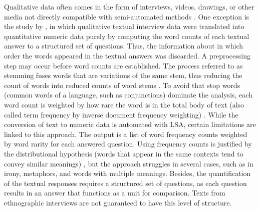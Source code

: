 Qualitative data often comes in the form of interviews, videos, drawings, or other media not directly compatible with semi-automated methods \citep{Bjrner2015}. One exception is the study by \cite{Miaskiewicz2008}, in which qualitative textual interview data were translated into quantitative numeric data purely by computing the word counts of each textual answer to a structured set of questions. Thus, the information about in which order the words appeared in the textual answers was discarded. A preprocessing step may occur before word counts are established. The process referred to as stemming fuses words that are variations of the same stem, thus reducing the count of words into reduced counts of word stems \citep{Grimmer2013}. To avoid that stop words (common words of a language, such as conjunctions) dominate the analysis, each word count is weighted by how rare the word is in the total body of text (also called term frequency by inverse document frequency weighting) \citep{Grimmer2013}. While the conversion of text to numeric data is automated with LSA, certain limitations are linked to this approach. The output is a list of word frequency counts weighted by word rarity for each answered question. Using frequency counts is justified by the distributional hypothesis (words that appear in the same contexts tend to convey similar meanings) \citep{Sahlgren2008}, but the approach struggles in several cases, such as in irony, metaphors, and words with multiple meanings. Besides, the quantification of the textual responses requires a structured set of questions, as each question results in an answer that functions as a unit for comparison. Texts from ethnographic interviews are not guaranteed to have this level of structure.




